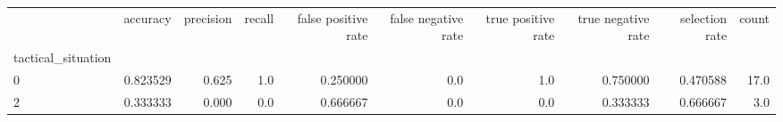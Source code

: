 \begin{tabular}{lrrrrrrrrr}
\toprule
{} &  accuracy &  precision &  recall &  false positive rate &  false negative rate &  true positive rate &  true negative rate &  selection rate &  count \\
tactical\_situation &           &            &         &                      &                      &                     &                     &                 &        \\
\midrule
0                  &  0.823529 &      0.625 &     1.0 &             0.250000 &                  0.0 &                 1.0 &            0.750000 &        0.470588 &   17.0 \\
2                  &  0.333333 &      0.000 &     0.0 &             0.666667 &                  0.0 &                 0.0 &            0.333333 &        0.666667 &    3.0 \\
\bottomrule
\end{tabular}
